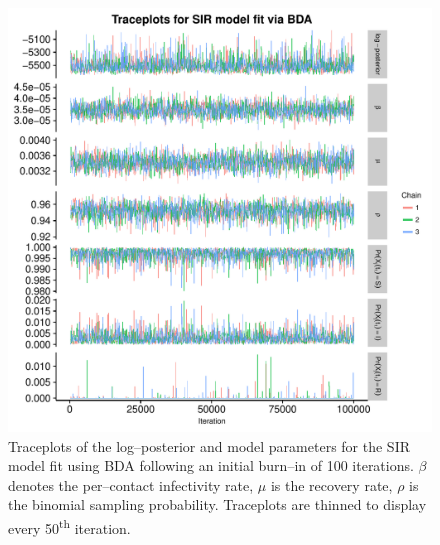 \begin{figure}[htbp]
	\centering
	\includegraphics[width=0.9\linewidth]{figures/misspec_sir_bda_traceplots.pdf}
	\caption{Traceplots of the log--posterior and model parameters for the SIR model fit using BDA following an initial burn--in of 100 iterations. $ \beta $ denotes the per--contact infectivity rate, $ \mu $ is the recovery rate, $ \rho $ is the binomial sampling probability. Traceplots are thinned to display every 50\textsuperscript{th} iteration.}
	\label{fig:misspec_sir_bda_traceplots}
\end{figure}

